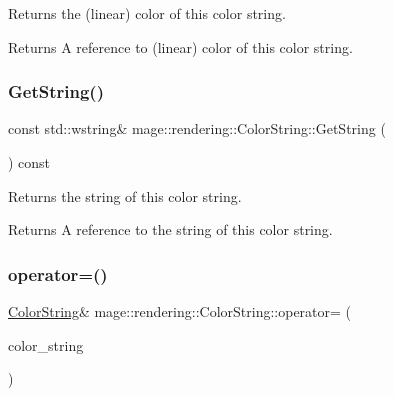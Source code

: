 Returns the (linear) color of this color string.

\begin{DoxyReturn}{Returns}
A reference to (linear) color of this color string. 
\end{DoxyReturn}
\mbox{\label{classmage_1_1rendering_1_1_color_string_a953db2aabafa120aab206e1295f92992}} 
\subsubsection{\texorpdfstring{Get\+String()}{GetString()}}
{\footnotesize\ttfamily const std\+::wstring\& mage\+::rendering\+::\+Color\+String\+::\+Get\+String (\begin{DoxyParamCaption}{ }\end{DoxyParamCaption}) const\hspace{0.3cm}{\ttfamily [noexcept]}}

Returns the string of this color string.

\begin{DoxyReturn}{Returns}
A reference to the string of this color string. 
\end{DoxyReturn}
\mbox{\label{classmage_1_1rendering_1_1_color_string_ab42304d36628f21263a4d545831b3829}} 
\subsubsection{\texorpdfstring{operator=()}{operator=()}\hspace{0.1cm}{\footnotesize\ttfamily [1/2]}}
{\footnotesize\ttfamily \mbox{\hyperlink{classmage_1_1rendering_1_1_color_string}{Color\+String}}\& mage\+::rendering\+::\+Color\+String\+::operator= (\begin{DoxyParamCaption}\item[{const \mbox{\hyperlink{classmage_1_1rendering_1_1_color_string}{Color\+String}} \&}]{color\+\_\+string }\end{DoxyParamCaption})\hspace{0.3cm}{\ttfamily [default]}}

